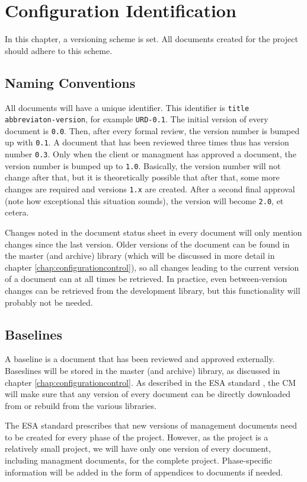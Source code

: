 \chapter{Configuration Identification}
\label{chap:configurationidentification}
In this chapter, a versioning scheme is set. All documents created for the \projectname{} project should adhere to this scheme.

\section{Naming Conventions}
All documents will have a unique identifier. This identifier is \texttt{title abbreviaton-version}, for example \texttt{URD-0.1}. The initial version of every document is \texttt{0.0}. Then, after every formal review, the version number is bumped up with \texttt{0.1}. A document that has been reviewed three times thus has version number \texttt{0.3}. Only when the client or managment has approved a document, the version number is bumped up to \texttt{1.0}. Basically, the version number will not change after that, but it is theoretically possible that after that, some more changes are required and versions \texttt{1.x} are created. After a second final approval (note how exceptional this situation sounds), the version will become \texttt{2.0}, et cetera.

Changes noted in the document status sheet in every document will only mention changes since the last version. Older versions of the document can be found in the master (and archive) library (which will be discussed in more detail in chapter \ref{chap:configurationcontrol}), so all changes leading to the current version of a document can at all times be retrieved. In practice, even between-version changes can be retrieved from the development library, but this functionality will probably not be needed.

\section{Baselines}
A baseline is a document that has been reviewed and approved externally. Baseslines will be stored in the master (and archive) library, as discussed in chapter \ref{chap:configurationcontrol}. As described in the ESA standard \cite{esa}, the CM will make sure that any version of every document can be directly downloaded from or rebuild from the various libraries.

The ESA standard prescribes that new versions of management documents need to be created for every phase of the project. However, as the \projectname{} project is a relatively small project, we will have only one version of every document, including managment documents, for the complete project. Phase-specific information will be added in the form of appendices to documents if needed.